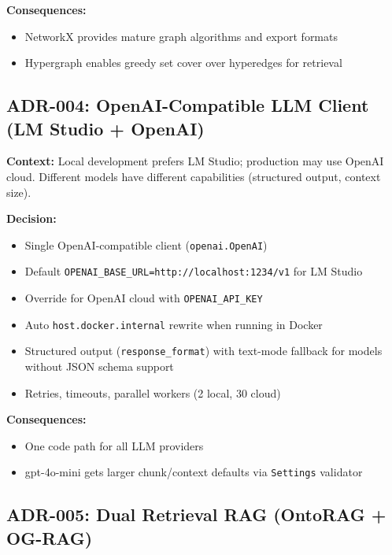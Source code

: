\documentclass[11pt,a4paper]{article}
\begin{document}
\textbf{Consequences:}
\begin{itemize}
    \item NetworkX provides mature graph algorithms and export formats
    \item Hypergraph enables greedy set cover over hyperedges for retrieval
\end{itemize}

\subsection{ADR-004: OpenAI-Compatible LLM Client (LM Studio + OpenAI)}
\label{sec:adr-llm}

\textbf{Context:} Local development prefers LM Studio; production may use OpenAI cloud. Different models have different capabilities (structured output, context size).

\textbf{Decision:}
\begin{itemize}
    \item Single OpenAI-compatible client (\texttt{openai.OpenAI})
    \item Default \texttt{OPENAI\_BASE\_URL=http://localhost:1234/v1} for LM Studio
    \item Override for OpenAI cloud with \texttt{OPENAI\_API\_KEY}
    \item Auto \texttt{host.docker.internal} rewrite when running in Docker
    \item Structured output (\texttt{response\_format}) with text-mode fallback for models without JSON schema support
    \item Retries, timeouts, parallel workers (2 local, 30 cloud)
\end{itemize}

\textbf{Consequences:}
\begin{itemize}
    \item One code path for all LLM providers
    \item gpt-4o-mini gets larger chunk/context defaults via \texttt{Settings} validator
\end{itemize}

\subsection{ADR-005: Dual Retrieval RAG (OntoRAG + OG-RAG)}
\label{sec:adr-rag}
\end{document}
